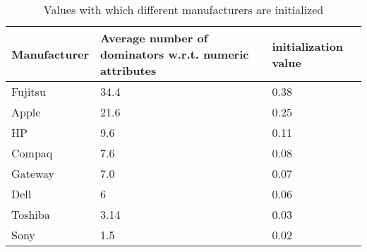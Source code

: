 \begin{table}
\renewcommand{\arraystretch}{1.3}
 \centering
 \begin{tabular}{|l |p{6cm}| l|}
  \hline 
   Manufacturer & Average number of dominators w.r.t. numeric attributes & initialization value \\
  \hline
  Fujitsu & 34.4 & 0.38  \\
  Apple & 21.6 &   0.25\\
  HP & 9.6 &   0.11\\
  Compaq & 7.6&   0.08\\
  Gateway & 7.0 &   0.07\\
  Dell & 6 &   0.06\\
  Toshiba & 3.14 &   0.03\\
  Sony & 1.5 &   0.02\\
  \hline
 \end{tabular}
 \caption{Values with which different manufacturers are initialized}
 \label{tab:marketEq}
\end{table}
